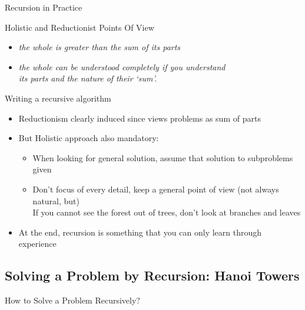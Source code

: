 \begin{Coupe}
\begin{frame}{Recursion in Practice}
  \begin{block}{Holistic and Reductionist Points Of View}
    \begin{itemize}
    \item {} \textit{the whole is greater than the sum of its
        parts}
    \item {} \textit{the whole can be understood
        completely if you understand \\
        its parts and the nature of their `sum'.}
    \end{itemize}    
  \end{block}

  \begin{block}{Writing a recursive algorithm}
    \begin{itemize}
    \item Reductionism clearly induced since views problems as sum of parts
    \item But Holistic approach also mandatory:
      \begin{itemize}
      \item When looking for general solution, assume that solution to
        subproblems given
      \item Don't focus of every detail, keep a general point of view
        {\footnotesize(not always natural, but)} \\
        If you cannot see the forest out of trees, don't look at branches and
        leaves
      \end{itemize}
    \item At the end, recursion is something that you can only learn through
      experience 
    \end{itemize}
  \end{block}

\end{frame}
\subsection{Solving a Problem by Recursion: Hanoi Towers}
\sectionpage
\begin{frame}{How to Solve a Problem Recursively?}


\end{frame}
\end{Coupe}
